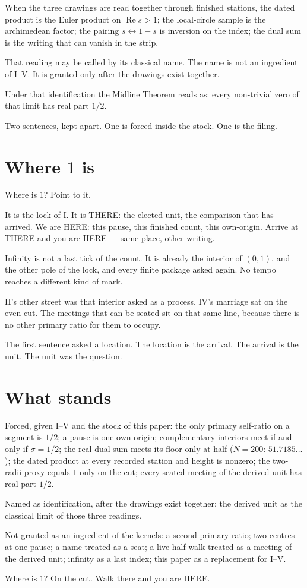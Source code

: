 \documentclass[10pt,a4paper]{article}
\theoremstyle{plain}
\theoremstyle{definition}
\theoremstyle{remark}
\begin{document}
When the three drawings are read together through finished stations, the dated product is the Euler product on \(\operatorname{Re}s>1\); the local-circle sample is the archimedean factor; the pairing \(s\leftrightarrow 1-s\) is inversion on the index; the dual sum is the writing that can vanish in the strip.

That reading may be called by its classical name.
The name is not an ingredient of I--V.
It is granted only after the drawings exist together.

Under that identification the Midline Theorem reads as: every non-trivial zero of that limit has real part \(1/2\).

Two sentences, kept apart.
One is forced inside the stock.
One is the filing.

\section{Where \(1\) is}

Where is \(1\)?
Point to it.

It is the lock of I.
It is THERE: the elected unit, the comparison that has arrived.
We are HERE: this pause, this finished count, this own-origin.
Arrive at THERE and you are HERE --- same place, other writing.

Infinity is not a last tick of the count.
It is already the interior of \((0,1)\), and the other pole of the lock, and every finite package asked again.
No tempo reaches a different kind of mark.

II's other street was that interior asked as a process.
IV's marriage sat on the even cut.
The meetings that can be seated sit on that same line, because there is no other primary ratio for them to occupy.

The first sentence asked a location.
The location is the arrival.
The arrival is the unit.
The unit was the question.

\section{What stands}

Forced, given I--V and the stock of this paper:
the only primary self-ratio on a segment is \(1/2\);
a pause is one own-origin;
complementary interiors meet if and only if \(\sigma=1/2\);
the real dual sum meets its floor only at half (\(N=200\): \(51.7185\ldots\));
the dated product at every recorded station and height is nonzero;
the two-radii proxy equals \(1\) only on the cut;
every seated meeting of the derived unit has real part \(1/2\).

Named as identification, after the drawings exist together:
the derived unit as the classical limit of those three readings.

Not granted as an ingredient of the kernels:
a second primary ratio;
two centres at one pause;
a name treated as a seat;
a live half-walk treated as a meeting of the derived unit;
infinity as a last index;
this paper as a replacement for I--V.

Where is \(1\)?
On the cut.
Walk there and you are HERE.
\end{document}
